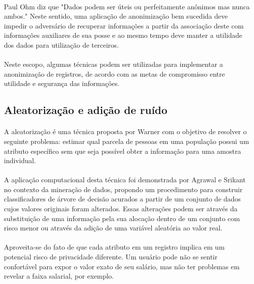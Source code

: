 \paragraph{} Paul Ohm\cite{ohm2009} diz que "Dados podem ser úteis ou perfeitamente anônimos mas nunca ambos." Neste sentido, uma aplicação de anonimização bem sucedida deve impedir o adversário de recuperar informações a partir da associação deste com informações auxiliares de sua posse e ao mesmo tempo deve manter a utilidade dos dados para utilização de terceiros. 

\paragraph{} Neste escopo, algumas técnicas podem ser utilizadas para implementar a anonimização de registros, de acordo com as metas de compromisso entre utilidade e segurança das informações.

\subsection{Aleatorização e adição de ruído}

\paragraph{} A aleatorização é uma técnica proposta por Warner\cite{warner1965randomized} com o objetivo de resolver o seguinte problema: estimar qual parcela de pessoas em uma população possui um atributo específico sem que seja possível obter a informação para uma amostra individual. 

\paragraph{} A aplicação computacional desta técnica foi demonstrada por Agrawal e Srikant\cite{agrawal2000privacy} no contexto da mineração de dados, propondo um procedimento para construir classificadores de árvore de decisão acurados a partir de um conjunto de dados cujos valores originais foram alterados. Essas alterações podem ser através da substituição de uma informação pela sua alocação dentro de um conjunto com risco menor ou através da adição de uma variável aleatória ao valor real.

\paragraph{} Aproveita-se do fato de que cada atributo em um registro implica em um potencial risco de privacidade diferente. Um usuário pode não se sentir confortável para expor o valor exato de seu salário, mas não ter problemas em revelar a faixa salarial, por exemplo.

